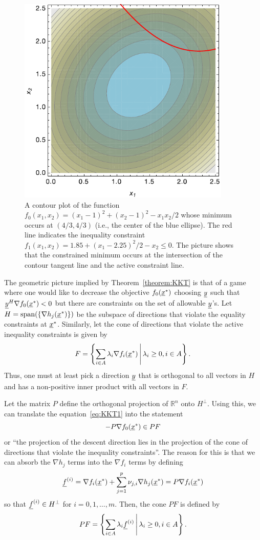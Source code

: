 \begin{figure}[t]
  \begin{center}
    \includegraphics[width=4in]{opt_fig}
  \end{center}
  \caption{A contour plot of the function $f_0 (x_1,x_2) = (x_1 - 1)^2 + (x_2 - 1)^2 - x_1 x_2 /2$ whose minimum occurs at $(4/3,4/3)$ (i.e., the center of the blue ellipse).  The red line indicates the inequality constraint $f_1 (x_1,x_2)= 1.85 + (x_1 - 2.25)^2 / 2 - x_2 \leq 0$. The picture shows that the constrained minimum occurs at the intersection of the contour tangent line and the active constraint line.}
\end{figure}

The geometric picture implied by Theorem~\ref{theorem:KKT} is that of a game where one would like to decrease the objective $f_0 (\underline{x}^*)$ choosing $\underline{y}$ such that $\underline{y}^H \nabla f_0 (\underline{x}^*) < 0$ but there are  constraints on the set of allowable $\underline{y}$'s.
Let $H = \mathrm{span} ( \{ \nabla h_j (\underline{x}^*) \})$ be the subspace of directions that violate the equality constraints at $\underline{x}^*$.
Similarly, let the cone of directions that violate the active inequality constraints is given by
\[ F = \left\{ \sum_{i\in A} \lambda_i \nabla f_i (\underline{x}^*) \, \middle| \, \lambda_i \geq 0, i \in A   \right\}. \]
Thus, one must at least pick a direction $\underline{y}$ that is orthogonal to all vectors in $H$ and has a non-positive inner product with all vectors in $F$.

Let the matrix $P$ define the orthogonal projection of $\mathbb{R}^n$ onto $H^\perp$.
Using this, we can translate the equation~\eqref{eq:KKT1} into the statement
\[ -P \nabla f_0 (\underline{x}^*) \in P F \]  or ``the projection of the descent direction lies in the projection of the cone of directions that violate the inequality constraints''.
The reason for this is that we can absorb the $\nabla h_j$ terms into the $\nabla f_i$ terms by defining
\[ \underline{f}^{(i)} = \nabla f_i (\underline{x}^*) + \sum_{j=1}^p \nu_{j,i} \nabla h_j (\underline{x}^*) = P \nabla f_i (\underline{x}^*) \]
so that $\underline{f}^{(i)} \in H^{\perp}$ for $i=0,1,\ldots,m$.
Then, the cone $PF$ is defined by
\[ PF = \left\{ \sum_{i\in A} \lambda_i \underline{f}^{(i)} \, \middle| \, \lambda_i \geq 0, i\in A \right\}. \]

